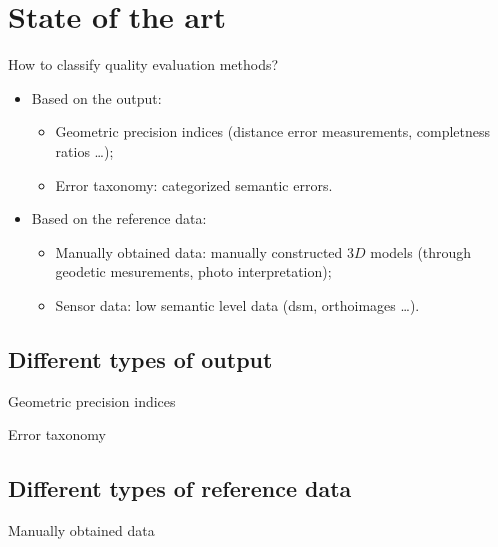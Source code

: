 \documentclass{beamer}
\begin{document}
    \section{State of the art}
        \begin{frame}{How to classify quality evaluation methods?}
            \begin{itemize}[label=$\blacktriangleright$, font=\color{IGNGreen}]
                \item Based on the output:
                \begin{itemize}[label=--]
                    \item Geometric precision indices (distance error measurements, completness ratios \dots);
                    \item Error taxonomy: categorized semantic errors.
                \end{itemize}
                \item Based on the reference data:
                \begin{itemize}[label=--]
                    \item Manually obtained data: manually constructed $3D$ models (through geodetic mesurements, photo interpretation);
                    \item Sensor data: low semantic level data (\gls{dsm}, orthoimages \dots).
                \end{itemize}
            \end{itemize}
        \end{frame}
        \subsection{Different types of output}
            \begin{frame}{Geometric precision indices}

            \end{frame}

            \begin{frame}{Error taxonomy}

            \end{frame}
        \subsection{Different types of reference data}
            \begin{frame}{Manually obtained data}

            \end{frame}
\end{document}
